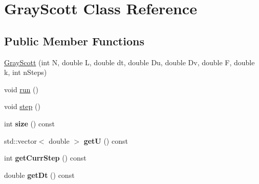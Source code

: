 \hypertarget{classGrayScott}{\section{Gray\-Scott Class Reference}
\label{classGrayScott}
}
\subsection*{Public Member Functions}
\begin{DoxyCompactItemize}
\item 
\hyperlink{classGrayScott_aea6ca9ee2a59a337730a787c400a858d}{Gray\-Scott} (int N, double L, double dt, double Du, double Dv, double F, double k, int n\-Steps)
\item 
void \hyperlink{classGrayScott_adf11a6024de7c77b1e1aae00fa78d174}{run} ()
\item 
void \hyperlink{classGrayScott_a60239e744d4cf6c74fc2af1c45abd8ce}{step} ()
\item 
\hypertarget{classGrayScott_a1925a03a32d117d3163e633c57703bcf}{int {\bfseries size} () const }\label{classGrayScott_a1925a03a32d117d3163e633c57703bcf}

\item 
\hypertarget{classGrayScott_a0704c788a8cdf28a49c0d21ef4ecfda1}{std\-::vector$<$ double $>$ {\bfseries get\-U} () const }\label{classGrayScott_a0704c788a8cdf28a49c0d21ef4ecfda1}

\item 
\hypertarget{classGrayScott_adbff28843549d47f8b3cda66f3915564}{int {\bfseries get\-Curr\-Step} () const }\label{classGrayScott_adbff28843549d47f8b3cda66f3915564}

\item 
\hypertarget{classGrayScott_a000f333075534d13d605cb062089aadb}{double {\bfseries get\-Dt} () const }\label{classGrayScott_a000f333075534d13d605cb062089aadb}

\end{DoxyCompactItemize}


